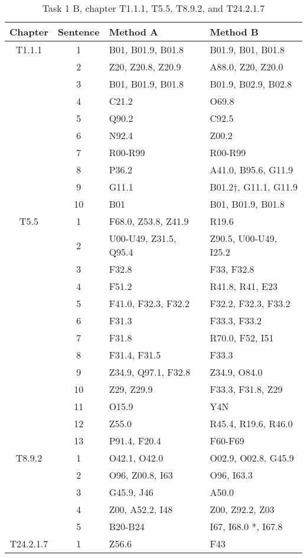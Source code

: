 \begin{table}[htbp] \footnotesize \center
\caption{Task 1 B, chapter T1.1.1, T5.5, T8.9.2, and T24.2.1.7\label{tab:task1b}}
\begin{tabular}{c c l l}
    \toprule
    Chapter & Sentence & Method A & Method B \\
    \midrule
	T1.1.1 & 1 & B01, B01.9, B01.8 & B01.9, B01, B01.8 \\
	 & 2 & Z20, Z20.8, Z20.9 & A88.0, Z20, Z20.0 \\
	 & 3 & B01, B01.9, B01.8 & B01.9, B02.9, B02.8 \\
	 & 4 & C21.2 & O69.8 \\
	 & 5 & Q90.2 & C92.5 \\
	 & 6 & N92.4 & Z00.2 \\
	 & 7 & R00-R99 & R00-R99 \\
	 & 8 & P36.2 & A41.0, B95.6, G11.9 \\
	 & 9 & G11.1 & B01.2†, G11.1, G11.9 \\
	 & 10 & B01 & B01, B01.9, B01.8 \\
	\addlinespace
	T5.5 & 1 & F68.0, Z53.8, Z41.9 & R19.6 \\
	 & 2 & U00-U49, Z31.5, Q95.4 & Z90.5, U00-U49, I25.2 \\
	 & 3 & F32.8 & F33, F32.8 \\
	 & 4 & F51.2 & R41.8, R41, E23 \\
	 & 5 & F41.0, F32.3, F32.2 & F32.2, F32.3, F33.2 \\
	 & 6 & F31.3 & F33.3, F33.2 \\
	 & 7 & F31.8 & R70.0, F52, I51 \\
	 & 8 & F31.4, F31.5 & F33.3 \\
	 & 9 & Z34.9, Q97.1, F32.8 & Z34.9, O84.0 \\
	 & 10 & Z29, Z29.9 & F33.3, F31.8, Z29 \\
	 & 11 & O15.9 & Y4N \\
	 & 12 & Z55.0 & R45.4, R19.6, R46.0 \\
	 & 13 & P91.4, F20.4 & F60-F69 \\
	\addlinespace
	T8.9.2 & 1 & O42.1, O42.0 & O02.9, O02.8, G45.9 \\
	 & 2 & O96, Z00.8, I63 & O96, I63.3 \\
	 & 3 & G45.9, J46 & A50.0 \\
	 & 4 & Z00, A52.2, I48 & Z00, Z92.2, Z03 \\
	 & 5 & B20-B24 & I67, I68.0 *, I67.8 \\
	\addlinespace
	T24.2.1.7 & 1 & Z56.6 & F43 \\

\end{tabular}
\end{table}
